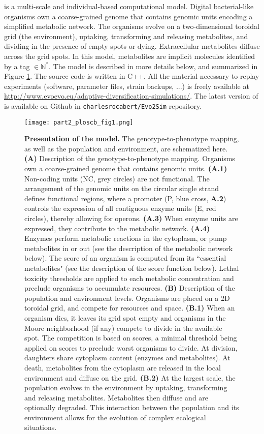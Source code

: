 {\EvoEvoSim} is a multi-scale and individual-based computational model. Digital bacterial-like organisms own a coarse-grained genome that contains genomic units encoding a simplified metabolic network. The organisms evolve on a two-dimensional toroidal grid (the environment), uptaking, transforming and releasing metabolites, and dividing in the presence of empty spots or dying. Extracellular metabolites diffuse across the grid spots. In this model, metabolites are implicit molecules identified by a tag $\in \mathbb{N}^*$. The model is described in more details below, and summarized in Figure \ref{fig:part2:first_result:Fig1}. The source code is written in C++. All the material necessary to replay experiments (software, parameter files, strain backups, ...) is freely available at \href{http://www.evoevo.eu/adaptive-diversification-simulations/}{http://www.evoevo.eu/adaptive-diversification-simulations/}. The latest version of {\EvoEvoSim} is available on Github in \texttt{charlesrocabert/Evo2Sim} repository.

\begin{figure}[!h]
\centering
\texttt{[image: part2\_ploscb\_fig1.png]}
\caption[Presentation of the model.]{{\bf Presentation of the model.} The genotype-to-phenotype mapping, as well as the population and environment, are schematized here. {\bf (A)} Description of the genotype-to-phenotype mapping. Organisms own a coarse-grained genome that contains genomic units. {\bf (A.1)} Non-coding units (NC, grey circles) are not functional. The arrangement of the genomic units on the circular single strand defines functional regions, where a promoter (P, blue cross, {\bf A.2}) controls the expression of all contiguous enzyme units (E, red circles), thereby allowing for operons. {\bf (A.3)} When enzyme units are expressed, they contribute to the metabolic network. {\bf (A.4)} Enzymes perform metabolic reactions in the cytoplasm, or pump metabolites in or out (see the description of the metabolic network below). The score of an organism is computed from its ``essential metabolites" (see the description of the score function below). Lethal toxicity thresholds are applied to each metabolic concentration and preclude organisms to accumulate resources. {\bf (B)} Description of the population and environment levels. Organisms are placed on a 2D toroidal grid, and compete for resources and space. {\bf (B.1)} When an organism dies, it leaves its grid spot empty and organisms in the Moore neighborhood (if any) compete to divide in the available spot. The competition is based on scores, a minimal threshold being applied on scores to preclude worst organisms to divide. At division, daughters share cytoplasm content (enzymes and metabolites). At death, metabolites from the cytoplasm are released in the local environment and diffuse on the grid. {\bf (B.2)} At the largest scale, the population evolves in the environment by uptaking, transforming and releasing metabolites. Metabolites then diffuse and are optionally degraded. This interaction between the population and its environment allows for the evolution of complex ecological situations.}
\label{fig:part2:first_result:Fig1}
\end{figure}


